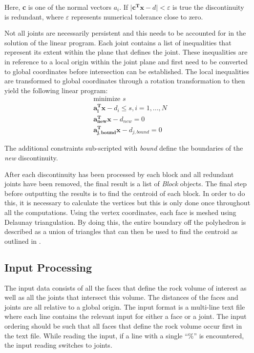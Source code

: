 Here, \textbf{c} is one of the normal vectors $a_{i}$. If $\vert \boldsymbol{c^{T} x} - d \vert < \varepsilon$ is true the discontinuity is redundant, where $\varepsilon$ represents numerical tolerance close to zero. \par

Not all joints are necessarily persistent and this needs to be accounted for in the solution of the linear program. Each joint contains a list of inequalities that represent its extent within the plane that defines the joint. These inequalities are in reference to a local origin within the joint plane and first need to be converted to global coordinates before intersection can be established. The local inequalities are transformed to global coordinates through a rotation transformation to then yield the following linear program: 
\begin{equation}
\begin{aligned} 
&\text{minimize } s\\
&\boldsymbol{a_{i}^{T} x} - d_i \leq s, i = 1,...,N\\
&\boldsymbol{a_{new}^{T} x} - d_{new} = 0\\
&\boldsymbol{a_{j,bound}^{T} x} - d_{j,bound} = 0
\end{aligned}
\end{equation}

The additional constraints sub-scripted with \textit{bound} define the boundaries of the \textit{new} discontinuity. 

After each discontinuity has been processed by each block and all redundant joints have been removed, the final result is a list of \textit{Block} objects. The final step before outputting the results is to find the centroid of each block. In order to do this, it is necessary to calculate the vertices but this is only done once throughout all the computations. Using the vertex coordinates, each face is meshed using Delaunay triangulation. By doing this, the entire boundary off the polyhedron is described as a union of triangles that can then be used to find the centroid as outlined in \cite{centroid}. 

\subsection{Input Processing}
The input data consists of all the faces that define the rock volume of interest as well as all the joints that intersect this volume. The distances of the faces and joints are all relative to a global origin. The input format is a multi-line text file where each line contains the relevant input for either a face or a joint. The input ordering should be such that all faces that define the rock volume occur first in the text file. While reading the input, if a line with a single ``\%'' is encountered, the input reading switches to joints. \par


